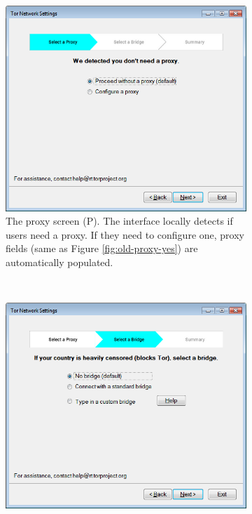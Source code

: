 \documentclass[USenglish,oneside,twocolumn]{article}
\begin{document}
\begin{figure}
\begin{subfigure}[b]{0.30\textwidth}
	\includegraphics[width=\textwidth]{screenshots/NEW-proxyYES.png}
	\centering\captionsetup{width=1.5\linewidth}%
	\caption{The proxy screen (P). The interface locally detects if users need a proxy. If they need to configure one, proxy fields (same as Figure \ref{fig:old-proxy-yes}) are automatically populated.}
	\label{fig:new-proxy}
\end{subfigure}
~~~~~~~~~~
\begin{subfigure}[b]{0.30\textwidth}
	\includegraphics[width=\textwidth]{screenshots/NEW-bridgeSettings.png}

\end{subfigure}
\end{figure}
\end{document}
